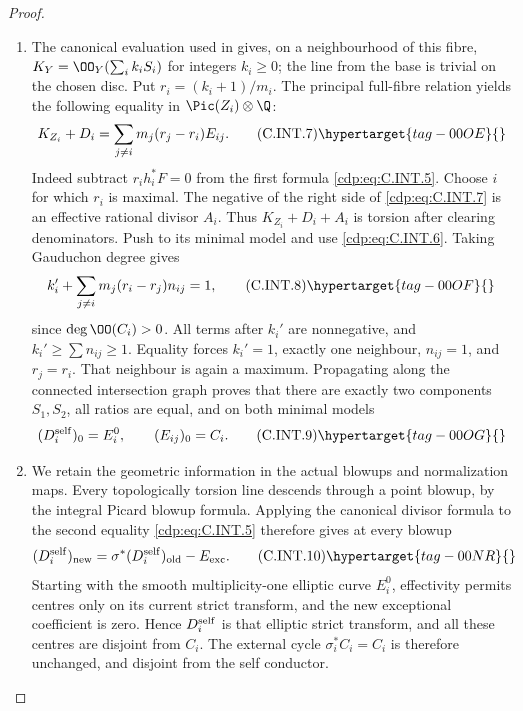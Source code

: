 \begin{proof}
\begin{enumerate}[label={$\langle1\rangle$\arabic*.},leftmargin=*]
\item The canonical evaluation used in  gives, on a
neighbourhood of this fibre,
$K_Y=\OO_Y(\sum_i k_iS_i)$ for integers $k_i\ge0$;
the line from the base is trivial on the chosen disc.
Put $r_i=(k_i+1)/m_i$. The principal full-fibre
relation yields the following equality in
$\Pic(Z_i)\otimes\Q$:
\[
 K_{Z_i}+D_i
   =\sum_{j\ne i}m_j(r_j-r_i)E_{ij}.
 \tag{C.INT.7}\hypertarget{tag-00OE}{}\label{cdp:eq:C.INT.7}
\]
Indeed subtract $r_i h_i^*F=0$ from the first
formula \eqref{cdp:eq:C.INT.5}. Choose $i$ for which $r_i$ is
maximal. The negative of the right side of
\eqref{cdp:eq:C.INT.7} is an effective rational divisor $A_i$.
Thus $K_{Z_i}+D_i+A_i$ is torsion after clearing
denominators. Push to its minimal model and use
\eqref{cdp:eq:C.INT.6}. Taking Gauduchon degree gives
\[
 k_i'+\sum_{j\ne i}m_j(r_i-r_j)n_{ij}=1,
 \tag{C.INT.8}\hypertarget{tag-00OF}{}\label{cdp:eq:C.INT.8}
\]
since $\deg\OO(C_i)>0$. All terms after $k_i'$
are nonnegative, and $k_i'\ge\sum n_{ij}\ge1$.
Equality forces $k_i'=1$, exactly one neighbour,
$n_{ij}=1$, and $r_j=r_i$. That neighbour is again
a maximum. Propagating along the connected
intersection graph proves that there are exactly
two components $S_1,S_2$, all ratios are equal,
and on both minimal models
\[
 (D_i^{\rm self})_0=E_i^0,
 \qquad (E_{ij})_0=C_i.
 \tag{C.INT.9}\hypertarget{tag-00OG}{}\label{cdp:eq:C.INT.9}
\]

\item We retain the geometric information in the actual
blowups and normalization maps. Every topologically
torsion line descends through a point blowup, by the
integral Picard blowup formula. Applying the
canonical divisor formula to the second equality
\eqref{cdp:eq:C.INT.5} therefore gives at every blowup
\[
 (D_i^{\rm self})_{\rm new}
   =\sigma^*(D_i^{\rm self})_{\rm old}-E_{\rm exc}.
 \tag{C.INT.10}\hypertarget{tag-00NR}{}\label{cdp:eq:C.INT.10}
\]
Starting with the smooth multiplicity-one elliptic
curve $E_i^0$, effectivity permits centres only on
its current strict transform, and the new
exceptional coefficient is zero. Hence
$D_i^{\rm self}$ is that elliptic strict transform,
and all these centres are disjoint from $C_i$.
The external cycle $\sigma_i^*C_i=C_i$ is therefore
unchanged, and disjoint from the self conductor.


\end{enumerate}
\end{proof}
